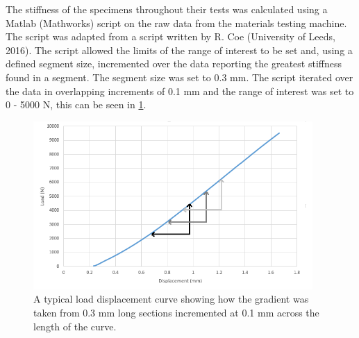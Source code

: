 

The stiffness of the specimens throughout their tests was calculated using a
Matlab (Mathworks) script on the raw data from the materials testing machine. The script was adapted from a script written by R. Coe (University of Leeds, 2016). The script
allowed the limits of the range of interest to be set and, using a defined
segment size, incremented over the data reporting the greatest stiffness found
in a segment. The segment size was set to 0.3 mm. The script iterated over the
data in overlapping increments of 0.1 mm and the range of interest was set to 0 - 5000 N, this can be seen in \cref{fig:load_disp_incr}.

\begin{figure}[ht!]

\centering
\includegraphics[width=4.18472in]{images/load_disp_incr.png}
\caption{A typical load displacement curve showing how the gradient was taken from 0.3 mm long sections incremented at 0.1 mm across the length of the curve.}
\label{fig:load_disp_incr}
\end{figure}


